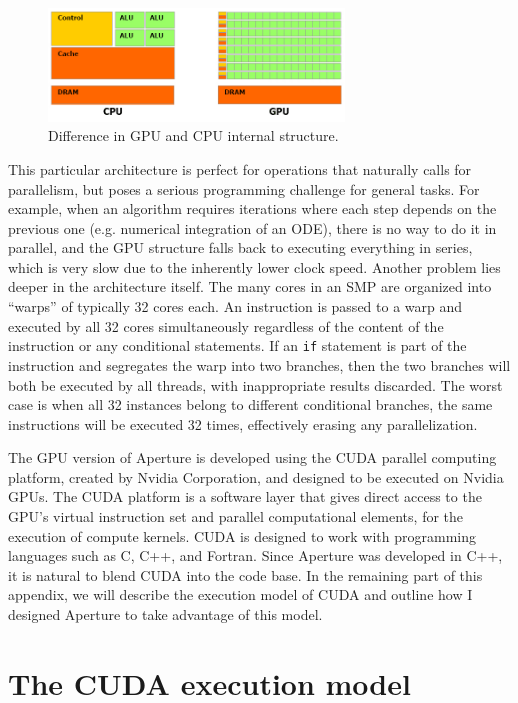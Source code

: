 \begin{figure}[h]
  \centering
  \includegraphics[width=0.7\textwidth]{pics/appendix/gputech_f2.png}
  \caption{Difference in GPU and CPU internal structure.}
  \label{fig:gpu-vs-cpu}
\end{figure}

This particular architecture is perfect for operations that naturally calls for
parallelism, but poses a serious programming challenge for general tasks. For
example, when an algorithm requires iterations where each step depends on the
previous one (e.g. numerical integration of an ODE), there is no way to do it in
parallel, and the GPU structure falls back to executing everything in series,
which is very slow due to the inherently lower clock speed. Another problem lies
deeper in the architecture itself. The many cores in an SMP are organized into
``warps'' of typically 32 cores each. An instruction is passed to a warp and
executed by all 32 cores simultaneously regardless of the content of the
instruction or any conditional statements. If an \verb!if! statement is part of
the instruction and segregates the warp into two branches, then the two branches
will both be executed by all threads, with inappropriate results discarded. The
worst case is when all 32 instances belong to different conditional branches,
the same instructions will be executed 32 times, effectively erasing any
parallelization.

The GPU version of Aperture is developed using the CUDA parallel computing
platform, created by Nvidia Corporation, and designed to be executed on Nvidia
GPUs. The CUDA platform is a software layer that gives direct access to the
GPU's virtual instruction set and parallel computational elements, for the
execution of compute kernels. CUDA is designed to work with programming
languages such as C, C++, and Fortran. Since Aperture was developed in C++, it
is natural to blend CUDA into the code base. In the remaining part of this
appendix, we will describe the execution model of CUDA and outline how I
designed Aperture to take advantage of this model.

\section{The CUDA execution model}
\label{sec:cuda-model}

